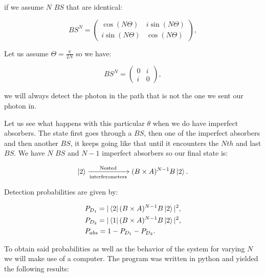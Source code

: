 \documentclass{book}
\begin{document}
if we assume $N$ $BS$ that are identical:

\begin{equation}
BS^{N}=\begin{pmatrix} \cos(N\Theta) & i \sin(N\Theta) \\ i \sin(N\Theta) & \cos(N\Theta) \end{pmatrix},
\end{equation}

Let us assume $\Theta=\frac{\pi}{2N}$ so we have:

\begin{equation}
BS^{N}=\begin{pmatrix} 0 & i  \\ i  & 0 \end{pmatrix},
\end{equation}

 we will always detect the photon in the path that is not the one we sent our photon in.
 
  Let us see what happens with this particular $\theta$ when we do have imperfect absorbers. The state first goes through a $BS$, then one of the imperfect absorbers and then another $BS$, it keeps going like that until it encounters the $Nth$ and last $BS$. We have $N$ $BS$ and $N-1$ imperfect absorbers so our final state is:


\begin{equation}\ket{2}\xrightarrow[\text{interferometers}]{\text{Nested}}(B \times A)^{N-1}B \ket{2}.
\end{equation}

Detection probabilities are given by:

\begin{align}
&P_{D_{1}}=|\bra{2} (B \times A)^{N-1}B \ket{2}|^2,\\
&P_{D_{2}}=|\bra{1} (B \times A)^{N-1}B \ket{2}|^2,\\
&P_{abs}=1-P_{D_{1}}-P_{D_{2}}.
\label{comentatio}
\end{align}
 
 
To obtain said probabilities as well as the behavior of the system for varying $N$ we will make use of a computer. The program was written in python and yielded the following results:
\end{document}
